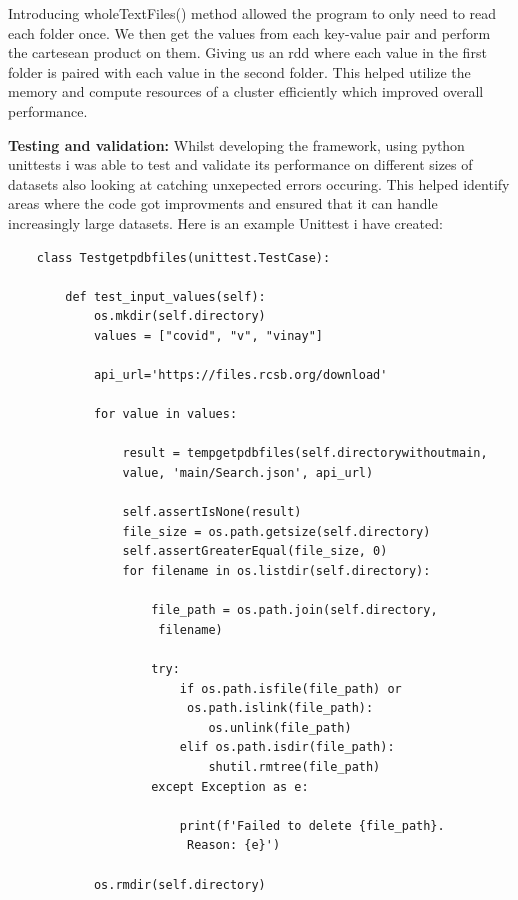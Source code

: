 \documentclass[]{final_report}
\begin{document}
Introducing wholeTextFiles() method allowed the program to only need to read each folder once. We then get the values from each key-value pair and perform the cartesean product on them. Giving us an rdd where each value in the first folder is paired with each value in the second folder. This helped utilize the memory and compute resources of a cluster efficiently which improved overall performance.

\clearpage

\textbf{Testing and validation:} Whilst developing the framework, using python unittests i was able to test and validate its performance on different sizes of datasets also looking at catching unxepected errors occuring. This helped identify areas where the code got improvments and ensured that it can handle increasingly large datasets. Here is an example Unittest i have created: 

\begin{lstlisting}
    class Testgetpdbfiles(unittest.TestCase):

        def test_input_values(self):
            os.mkdir(self.directory)
            values = ["covid", "v", "vinay"]

            api_url='https://files.rcsb.org/download'

            for value in values:

                result = tempgetpdbfiles(self.directorywithoutmain, 
                value, 'main/Search.json', api_url)

                self.assertIsNone(result)
                file_size = os.path.getsize(self.directory)
                self.assertGreaterEqual(file_size, 0)
                for filename in os.listdir(self.directory):

                    file_path = os.path.join(self.directory,
                     filename)

                    try:
                        if os.path.isfile(file_path) or
                         os.path.islink(file_path):
                            os.unlink(file_path)
                        elif os.path.isdir(file_path):
                            shutil.rmtree(file_path)
                    except Exception as e:

                        print(f'Failed to delete {file_path}.
                         Reason: {e}')

            os.rmdir(self.directory)

\end{lstlisting}
\end{document}
